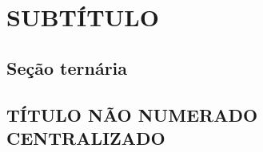 \lipsum[1][1-2000]
\section{SUBTÍTULO}
\lipsum[1][1-2000]
\subsection{Seção ternária}

\begin{center}
    \section*{TÍTULO NÃO NUMERADO CENTRALIZADO}
\end{center}